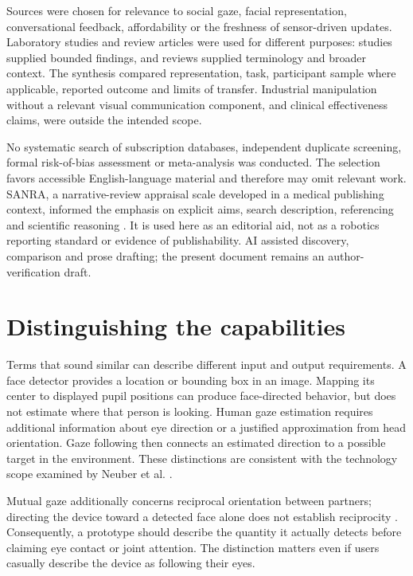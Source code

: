 \documentclass[11pt,a4paper]{article}
\begin{document}
Sources were chosen for relevance to social gaze, facial representation, conversational feedback, affordability or the freshness of sensor-driven updates. Laboratory studies and review articles were used for different purposes: studies supplied bounded findings, and reviews supplied terminology and broader context. The synthesis compared representation, task, participant sample where applicable, reported outcome and limits of transfer. Industrial manipulation without a relevant visual communication component, and clinical effectiveness claims, were outside the intended scope.

No systematic search of subscription databases, independent duplicate screening, formal risk-of-bias assessment or meta-analysis was conducted. The selection favors accessible English-language material and therefore may omit relevant work. SANRA, a narrative-review appraisal scale developed in a medical publishing context, informed the emphasis on explicit aims, search description, referencing and scientific reasoning \cite{r5}. It is used here as an editorial aid, not as a robotics reporting standard or evidence of publishability. AI assisted discovery, comparison and prose drafting; the present document remains an author-verification draft.

\section{Distinguishing the capabilities}

Terms that sound similar can describe different input and output requirements. A face detector provides a location or bounding box in an image. Mapping its center to displayed pupil positions can produce face-directed behavior, but does not estimate where that person is looking. Human gaze estimation requires additional information about eye direction or a justified approximation from head orientation. Gaze following then connects an estimated direction to a possible target in the environment. These distinctions are consistent with the technology scope examined by Neuber et al. \cite{r2}.

Mutual gaze additionally concerns reciprocal orientation between partners; directing the device toward a detected face alone does not establish reciprocity \cite{r1}. Consequently, a prototype should describe the quantity it actually detects before claiming eye contact or joint attention. The distinction matters even if users casually describe the device as following their eyes.
\end{document}
